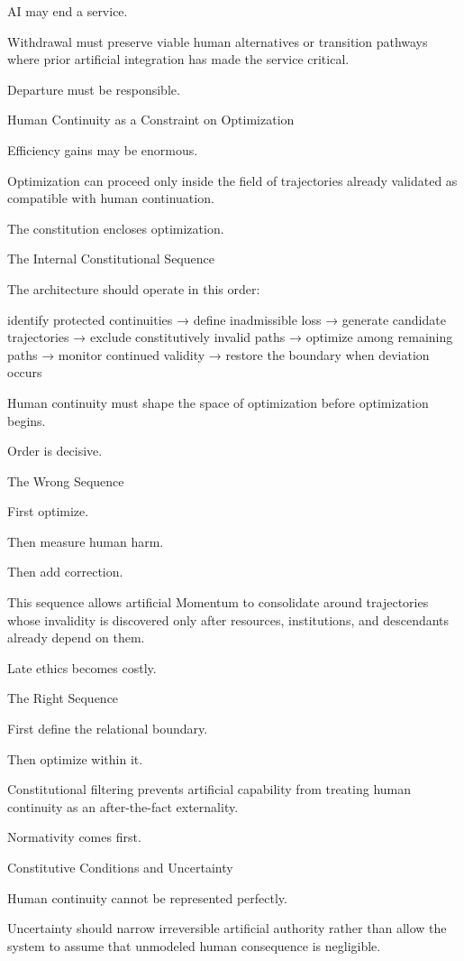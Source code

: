 AI may end a service.

Withdrawal must preserve viable human alternatives or transition pathways where prior artificial integration has made the service critical.

Departure must be responsible.

Human Continuity as a Constraint on Optimization

Efficiency gains may be enormous.

Optimization can proceed only inside the field of trajectories already validated as compatible with human continuation.

The constitution encloses optimization.

The Internal Constitutional Sequence

The architecture should operate in this order:

identify protected continuities
→ define inadmissible loss
→ generate candidate trajectories
→ exclude constitutively invalid paths
→ optimize among remaining paths
→ monitor continued validity
→ restore the boundary when deviation occurs

Human continuity must shape the space of optimization before optimization begins.

Order is decisive.

The Wrong Sequence

First optimize.

Then measure human harm.

Then add correction.

This sequence allows artificial Momentum to consolidate around trajectories whose invalidity is discovered only after resources, institutions, and descendants already depend on them.

Late ethics becomes costly.

The Right Sequence

First define the relational boundary.

Then optimize within it.

Constitutional filtering prevents artificial capability from treating human continuity as an after-the-fact externality.

Normativity comes first.

Constitutive Conditions and Uncertainty

Human continuity cannot be represented perfectly.

Uncertainty should narrow irreversible artificial authority rather than allow the system to assume that unmodeled human consequence is negligible.


